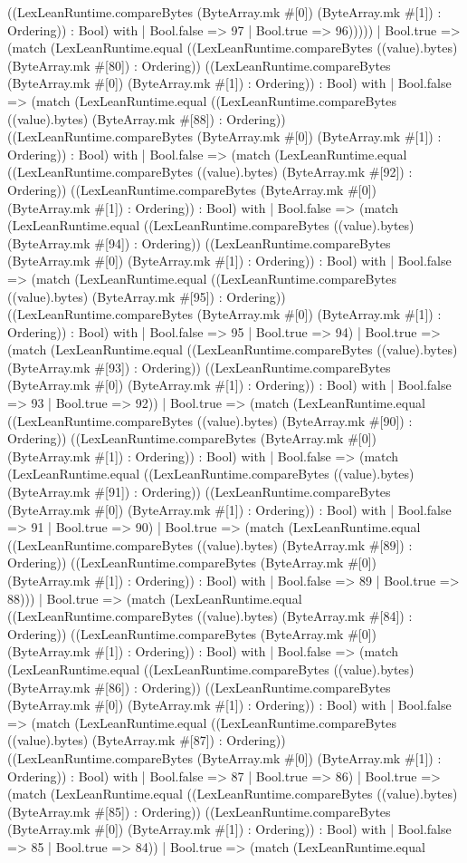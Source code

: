 \documentclass[11pt]{article}
\begin{document}
((LexLeanRuntime.compareBytes (ByteArray.mk \#[0]) (ByteArray.mk \#[1]) : Ordering)) : Bool) with | Bool.false => 97 | Bool.true => 96))))) | Bool.true => (match (LexLeanRuntime.equal ((LexLeanRuntime.compareBytes ((value).bytes) (ByteArray.mk \#[80]) : Ordering)) ((LexLeanRuntime.compareBytes (ByteArray.mk \#[0]) (ByteArray.mk \#[1]) : Ordering)) : Bool) with | Bool.false => (match (LexLeanRuntime.equal ((LexLeanRuntime.compareBytes ((value).bytes) (ByteArray.mk \#[88]) : Ordering)) ((LexLeanRuntime.compareBytes (ByteArray.mk \#[0]) (ByteArray.mk \#[1]) : Ordering)) : Bool) with | Bool.false => (match (LexLeanRuntime.equal ((LexLeanRuntime.compareBytes ((value).bytes) (ByteArray.mk \#[92]) : Ordering)) ((LexLeanRuntime.compareBytes (ByteArray.mk \#[0]) (ByteArray.mk \#[1]) : Ordering)) : Bool) with | Bool.false => (match (LexLeanRuntime.equal ((LexLeanRuntime.compareBytes ((value).bytes) (ByteArray.mk \#[94]) : Ordering)) ((LexLeanRuntime.compareBytes (ByteArray.mk \#[0]) (ByteArray.mk \#[1]) : Ordering)) : Bool) with | Bool.false => (match (LexLeanRuntime.equal ((LexLeanRuntime.compareBytes ((value).bytes) (ByteArray.mk \#[95]) : Ordering)) ((LexLeanRuntime.compareBytes (ByteArray.mk \#[0]) (ByteArray.mk \#[1]) : Ordering)) : Bool) with | Bool.false => 95 | Bool.true => 94) | Bool.true => (match (LexLeanRuntime.equal ((LexLeanRuntime.compareBytes ((value).bytes) (ByteArray.mk \#[93]) : Ordering)) ((LexLeanRuntime.compareBytes (ByteArray.mk \#[0]) (ByteArray.mk \#[1]) : Ordering)) : Bool) with | Bool.false => 93 | Bool.true => 92)) | Bool.true => (match (LexLeanRuntime.equal ((LexLeanRuntime.compareBytes ((value).bytes) (ByteArray.mk \#[90]) : Ordering)) ((LexLeanRuntime.compareBytes (ByteArray.mk \#[0]) (ByteArray.mk \#[1]) : Ordering)) : Bool) with | Bool.false => (match (LexLeanRuntime.equal ((LexLeanRuntime.compareBytes ((value).bytes) (ByteArray.mk \#[91]) : Ordering)) ((LexLeanRuntime.compareBytes (ByteArray.mk \#[0]) (ByteArray.mk \#[1]) : Ordering)) : Bool) with | Bool.false => 91 | Bool.true => 90) | Bool.true => (match (LexLeanRuntime.equal ((LexLeanRuntime.compareBytes ((value).bytes) (ByteArray.mk \#[89]) : Ordering)) ((LexLeanRuntime.compareBytes (ByteArray.mk \#[0]) (ByteArray.mk \#[1]) : Ordering)) : Bool) with | Bool.false => 89 | Bool.true => 88))) | Bool.true => (match (LexLeanRuntime.equal ((LexLeanRuntime.compareBytes ((value).bytes) (ByteArray.mk \#[84]) : Ordering)) ((LexLeanRuntime.compareBytes (ByteArray.mk \#[0]) (ByteArray.mk \#[1]) : Ordering)) : Bool) with | Bool.false => (match (LexLeanRuntime.equal ((LexLeanRuntime.compareBytes ((value).bytes) (ByteArray.mk \#[86]) : Ordering)) ((LexLeanRuntime.compareBytes (ByteArray.mk \#[0]) (ByteArray.mk \#[1]) : Ordering)) : Bool) with | Bool.false => (match (LexLeanRuntime.equal ((LexLeanRuntime.compareBytes ((value).bytes) (ByteArray.mk \#[87]) : Ordering)) ((LexLeanRuntime.compareBytes (ByteArray.mk \#[0]) (ByteArray.mk \#[1]) : Ordering)) : Bool) with | Bool.false => 87 | Bool.true => 86) | Bool.true => (match (LexLeanRuntime.equal ((LexLeanRuntime.compareBytes ((value).bytes) (ByteArray.mk \#[85]) : Ordering)) ((LexLeanRuntime.compareBytes (ByteArray.mk \#[0]) (ByteArray.mk \#[1]) : Ordering)) : Bool) with | Bool.false => 85 | Bool.true => 84)) | Bool.true => (match (LexLeanRuntime.equal 
\end{document}
